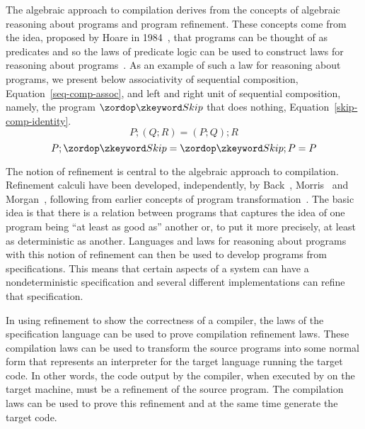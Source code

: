 \documentclass[a4paper,10pt]{report}
\begin{document}
The algebraic approach to compilation derives from the concepts of
algebraic reasoning about programs and program refinement.
These concepts come from the idea, proposed by Hoare in
1984~\cite{hoare1984}, that programs can be thought of as predicates
and so the laws of predicate logic can be used to construct laws for
reasoning about programs~\cite{hoare1987}.
As an example of such a law for reasoning about programs, we present
below associativity of sequential composition,
Equation~\eqref{seq-comp-assoc}, and left and right unit of sequential
composition, namely, the program $\Skip$ that does nothing,
Equation~\eqref{skip-comp-identity}.
\begin{equation}
  \label{seq-comp-assoc}
  P;(Q;R) = (P;Q);R
\end{equation}
\begin{equation}
  \label{skip-comp-identity}
  P;\Skip = \Skip;P = P
\end{equation}

The notion of refinement is central to the algebraic approach to
compilation.
Refinement calculi have been developed, independently, by
Back~\cite{back1981}, Morris~\cite{morris1987} and
Morgan~\cite{morgan1990}, following from earlier concepts of program
transformation~\cite{bauer1976, balzer1976, standish1976, arsac1979}.
The basic idea is that there is a relation between programs that
captures the idea of one program being ``at least as good as'' another
or, to put it more precisely, at least as deterministic as another.
Languages and laws for reasoning about programs with this notion of
refinement can then be used to develop programs from specifications.
This means that certain aspects of a system can have a
nondeterministic specification and several different implementations
can refine that specification.

In using refinement to show the correctness of a compiler, the laws of
the specification language can be used to prove compilation refinement
laws.
These compilation laws can be used to transform the source programs
into some normal form that represents an interpreter for the target
language running the target code.
In other words, the code output by the compiler, when executed by on
the target machine, must be a refinement of the source program.
The compilation laws can be used to prove this refinement and at the
same time generate the target code.
\end{document}
